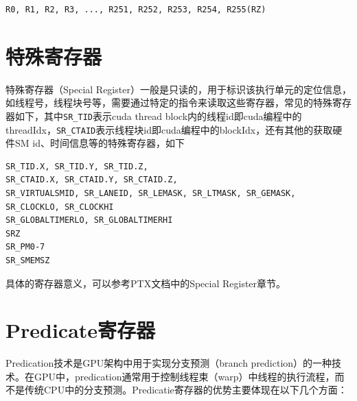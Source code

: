 \begin{lstlisting}
R0, R1, R2, R3, ..., R251, R252, R253, R254, R255(RZ)
\end{lstlisting}

\section{特殊寄存器}

特殊寄存器（Special Register）一般是只读的，用于标识该执行单元的定位信息，如线程号，线程块号等，需要通过特定的指令来读取这些寄存器，常见的特殊寄存器如下，其中\lstinline|SR_TID|表示cuda thread block内的线程id即cuda编程中的threadIdx，\lstinline|SR_CTAID|表示线程块id即cuda编程中的blockIdx，还有其他的获取硬件SM id、时间信息等的特殊寄存器，如下

\begin{lstlisting}
SR_TID.X, SR_TID.Y, SR_TID.Z,
SR_CTAID.X, SR_CTAID.Y, SR_CTAID.Z,
SR_VIRTUALSMID, SR_LANEID, SR_LEMASK, SR_LTMASK, SR_GEMASK,
SR_CLOCKLO, SR_CLOCKHI
SR_GLOBALTIMERLO, SR_GLOBALTIMERHI
SRZ
SR_PM0-7
SR_SMEMSZ
\end{lstlisting}

具体的寄存器意义，可以参考PTX文档中的Special Register章节。

\section{Predicate寄存器}

Predication技术是GPU架构中用于实现分支预测（branch prediction）的一种技术。在GPU中，predication通常用于控制线程束（warp）中线程的执行流程，而不是传统CPU中的分支预测。Predicatie寄存器的优势主要体现在以下几个方面：

